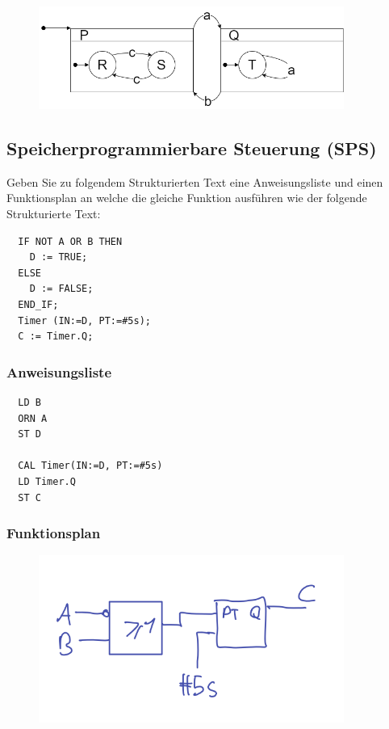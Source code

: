 \begin{figure}[H]
  \includegraphics[width=10cm]{images/KA090221/3a.png}
  \centering
\end{figure}

\subsection{Speicherprogrammierbare Steuerung (SPS)}
Geben Sie zu folgendem Strukturierten Text eine Anweisungsliste und einen Funktionsplan an welche die
gleiche Funktion ausführen wie der folgende Strukturierte Text:
\begin{lstlisting}
  IF NOT A OR B THEN
    D := TRUE;
  ELSE
    D := FALSE;
  END_IF;
  Timer (IN:=D, PT:=#5s);
  C := Timer.Q;
\end{lstlisting}

\subsubsection{Anweisungsliste}
\begin{lstlisting}
  LD B
  ORN A
  ST D

  CAL Timer(IN:=D, PT:=#5s)
  LD Timer.Q
  ST C
\end{lstlisting}

\subsubsection{Funktionsplan}
\begin{figure}[H]
  \includegraphics[width=10cm]{images/KA090221/6a.png}
  \centering
\end{figure}